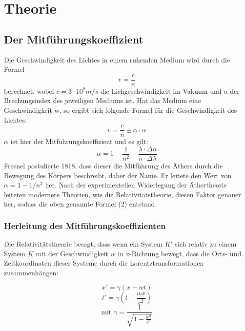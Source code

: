 \section{Theorie}

\subsection{Der Mitführungskoeffizient}

Die Geschwindigkeit des Lichtes in einem ruhenden Medium wird durch die Formel $$v=\frac{c}{n}$$ berechnet, wobei $c = 3\cdot 10^8 m/s$ die Lichgeschwindigkeit im Vakuum und $n$ der Brechungsindex des jeweiligen Mediums ist. Hat das Medium eine Geschwindigkeit w, so ergibt sich folgende Formel für die Geschwindigkeit des Lichtes:
\begin{equation} v = \frac{c}{n} \pm \alpha\cdot w  \end{equation}
$\alpha$ ist hier der Mitführungskoeffizient und es gilt:
\begin{equation} \alpha = 1 - \frac{1}{n^2} - \frac{\lambda\cdot\Delta n}{n \cdot\Delta\lambda} \end{equation}
Fresnel postulierte 1818, dass dieser die Mitführung des Äthers durch die Bewegung des Körpers beschreibt, daher der Name. Er leitete den Wert von $\alpha = 1 - 1/n^2$ her. Nach der experimentellen Widerlegung der Äthertheorie leiteten modernere Theorien, wie die Relativitätstheorie, diesen Faktor genauer her, sodass die oben genannte Formel (2) entstand.

\subsubsection{Herleitung des Mitführungskoeffizienten}

Die Relativitätstheorie besagt, dass wenn ein System $K'$ sich relativ zu einem System $K$ mit der Geschwindigkeit $w$ in x-Richtung bewegt, dass die Orts- und Zeitkoordinaten dieser Systeme durch die Lorentztransformationen zusammenhängen: 

\begin{equation} x' = \gamma (x-wt) \end{equation}
\begin{equation} t' = \gamma \left(t-\frac{wx}{c^2}\right) \end{equation}
\begin{equation} \text{mit \ } \gamma = \frac{1}{\sqrt{1-\frac{w^2}{c^2}}} \end{equation}

